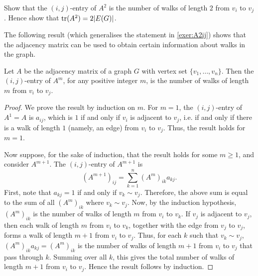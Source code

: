 \begin{Exercise}\label{exer:A2ij}
Show that the $(i,j)$-entry of $A^2$ is the number of walks of length $2$ from $v_i$ to $v_j$. Hence show that $\trace(A^2) = 2|E(G)|$.\\
\end{Exercise}

The following result (which generalises the statement in \cref{exer:A2ij}) shows that the adjacency matrix can be used to obtain certain information about walks in the graph.

\begin{Theorem}
Let $A$ be the adjacency matrix of a graph $G$ with vertex set $\{v_1, \ldots, v_n\}$. Then the $(i,j)$-entry of $A^m$, for any positive integer $m$, is the number of walks of length $m$ from $v_i$ to $v_j$.
\end{Theorem}

\begin{proof}
We prove the result by induction on $m$. For $m = 1$, the $(i,j)$-entry of $A^1 = A$ is $a_{ij}$, which is $1$ if and only if $v_i$ is adjacent to $v_j$, i.e. if and only if there is a walk of length $1$ (namely, an edge) from $v_i$ to $v_j$. Thus, the result holds for $m = 1$.

Now suppose, for the sake of induction, that the result holds for some $m \ge 1$, and consider $A^{m + 1}$. The $(i,j)$-entry of $A^{m + 1}$ is
\begin{equation*}
(A^{m + 1})_{ij} = \sum_{k = 1}^{n} (A^m)_{ik} a_{kj}.
\end{equation*}
First, note that $a_{kj} = 1$ if and only if $v_k \sim v_j$. Therefore, the above sum is equal to the sum of all $(A^m)_{ik}$ where $v_k \sim v_j$. Now, by the induction hypothesis, $(A^m)_{ik}$ is the number of walks of length $m$ from $v_i$ to $v_k$. If $v_j$ is adjacent to $v_j$, then each walk of length $m$ from $v_i$ to $v_k$, together with the edge from $v_j$ to $v_j$, forms a walk of length $m + 1$ from $v_i$ to $v_j$. Thus, for each $k$ such that $v_k \sim v_j$, $(A^m)_{ik} a_{kj} = (A^m)_{ik}$ is the number of walks of length $m + 1$ from $v_i$ to $v_j$ that pass through $k$. Summing over all $k$, this gives the total number of walks of length $m + 1$ from $v_i$ to $v_j$. Hence the result follows by induction.
\end{proof}

